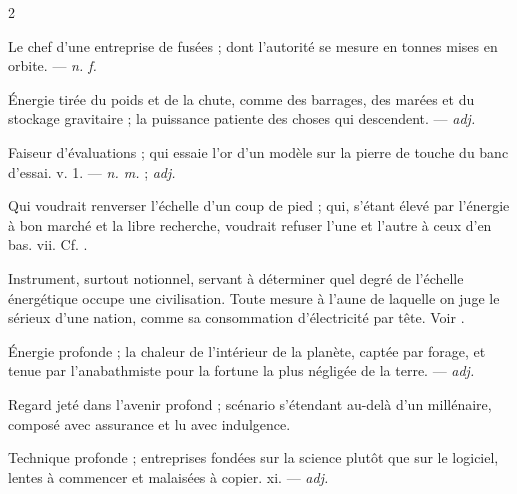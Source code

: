 \begin{multicols}{2}

 Le chef d'une entreprise de fusées ; dont l'autorité se mesure en tonnes mises en orbite.  —  \textit{n. f.}

 Énergie tirée du poids et de la chute, comme des barrages, des marées et du stockage gravitaire ; la puissance patiente des choses qui descendent. —  \textit{adj.}

 Faiseur d'évaluations ; qui essaie l'or d'un modèle sur la pierre de touche du banc d'essai.   v. 1. —  \textit{n. m.} ;  \textit{adj.}

 Qui voudrait renverser l'échelle d'un coup de pied ; qui, s'étant élevé par l'énergie à bon marché et la libre recherche, voudrait refuser l'une et l'autre à ceux d'en bas.   vii. Cf. .

  Instrument, surtout notionnel, servant à déterminer quel degré de l'échelle énergétique occupe une civilisation.   Toute mesure à l'aune de laquelle on juge le sérieux d'une nation, comme sa consommation d'électricité par tête.  Voir .

 Énergie profonde ; la chaleur de l'intérieur de la planète, captée par forage, et tenue par l'anabathmiste pour la fortune la plus négligée de la terre. —  \textit{adj.}

 Regard jeté dans l'avenir profond ; scénario s'étendant au-delà d'un millénaire, composé avec assurance et lu avec indulgence.

 Technique profonde ; entreprises fondées sur la science plutôt que sur le logiciel, lentes à commencer et malaisées à copier.   xi. —  \textit{adj.}


\end{multicols}
